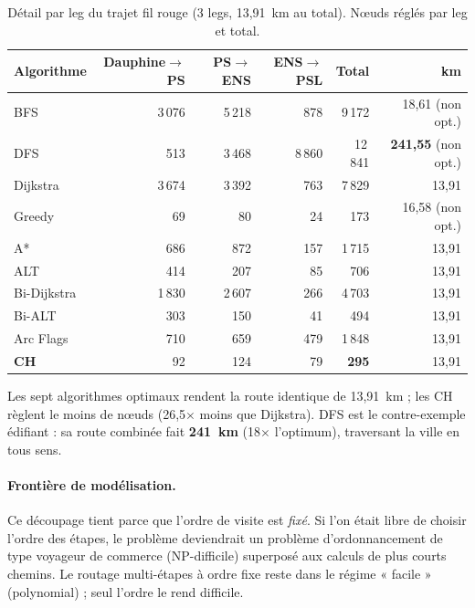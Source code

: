 \begin{table}[H]
  \centering
  \small
  \begin{tabular}{@{}lrrrrr@{}}
    \toprule
    Algorithme & Dauphine$\to$PS & PS$\to$ENS & ENS$\to$PSL & Total & km \\
    \midrule
    BFS         & 3\,076 & 5\,218 & 878    & 9\,172  & 18{,}61 (non opt.) \\
    DFS         & 513    & 3\,468 & 8\,860 & 12\,841 & \textbf{241{,}55} (non opt.) \\
    Dijkstra    & 3\,674 & 3\,392 & 763    & 7\,829  & 13{,}91 \\
    Greedy      & 69     & 80     & 24     & 173     & 16{,}58 (non opt.) \\
    A*          & 686    & 872    & 157    & 1\,715  & 13{,}91 \\
    ALT         & 414    & 207    & 85     & 706     & 13{,}91 \\
    Bi-Dijkstra & 1\,830 & 2\,607 & 266    & 4\,703  & 13{,}91 \\
    Bi-ALT      & 303    & 150    & 41     & 494     & 13{,}91 \\
    Arc Flags   & 710    & 659    & 479    & 1\,848  & 13{,}91 \\
    \textbf{CH} & 92     & 124    & 79     & \textbf{295} & 13{,}91 \\
    \bottomrule
  \end{tabular}
  \caption{Détail par leg du trajet fil rouge (3 legs, 13{,}91~km au total).
  Nœuds réglés par leg et total.}
  \label{tab:multistop}
\end{table}

Les sept algorithmes optimaux rendent la route identique de 13{,}91~km ; les CH
règlent le moins de nœuds (26{,}5$\times$ moins que Dijkstra). DFS est le
contre-exemple édifiant : sa route combinée fait \textbf{241~km} (18$\times$
l'optimum), traversant la ville en tous sens.

\paragraph{Frontière de modélisation.} Ce découpage tient parce que l'ordre de
visite est \emph{fixé}. Si l'on était libre de choisir l'ordre des étapes, le
problème deviendrait un problème d'ordonnancement de type voyageur de commerce
(NP-difficile) superposé aux calculs de plus courts chemins. Le routage
multi-étapes à ordre fixe reste dans le régime « facile » (polynomial) ; seul
l'ordre le rend difficile.

